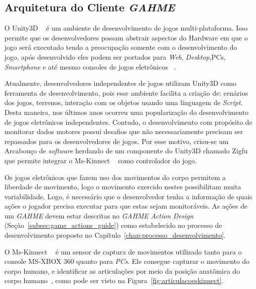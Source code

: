 \subsection{Arquitetura do Cliente \textit{GAHME}}\label{sec:cliente_game}
O Unity3D ~\cite{unity3d} é um ambiente de desenvolvimento de jogos multi-plataforma. Isso permite que os desenvolvedores possam abstrair aspectos do Hardware em que o jogo será executado tendo a preocupação somente com o desenvolvimento do jogo, após desenvolvido eles podem ser portados para \textit{Web}, \textit{Desktop},PCs, \textit{Smartphone} e até mesmo consoles de jogos eletrônicos ~\cite{unitysue}.

Atualmente, desenvolvedores independentes de jogos utilizam Unity3D como ferramenta de desenvolvimento, pois esse ambiente facilita a criação de: cenários dos jogos, terrenos, interação com os objetos usando uma linguagem de \textit{Script}. Desta maneira, nos últimos anos ocorreu uma popularização do desenvolvimento de jogos eletrônicos independentes.  Contudo, o desenvolvimento com propósito de monitorar dados motores possui desafios que não necessariamente precisam ser repassados para os desenvolvedores de jogos. Por esse motivo, criou-se um Arcabouço de \textit{software} herdando de um componente do Unity3D chamado Zigfu~\cite{zigfu} que permite integrar o Ms-Kinnect ~\cite{kinnect2013} como controlador do jogo. 

Os jogos eletrônicos que fazem uso dos movimentos do corpo permitem a liberdade de movimento, logo o movimento exercido nestes possibilitam muita variabilidade. Logo, é necessário que o desenvolvedor tenha a informação de quais ações o jogador precisa executar para que estas sejam monitoráveis. As ações de um \textit{GAHME} devem estar descritas no \textit{GAHME Action Design} (Seção~\ref{subsec:game_actions_guide}) como estabelecido no processo de desenvolvimento proposto no Capítulo~\ref{chap:processo_desenvolvimento}.

O Ms-Kinnect ~\cite{kinnect2013} é um sensor de captura de movimentos utilizado tanto para o console MS-XBOX 360 quanto para \textit{PCs}. Ele consegue capturar o movimento do corpo humano, e identificar as articulações por meio da posição anatômica do corpo humano~\cite{hamill1999bases}, como pode ser visto na Figura~\ref{fig:articulacoeskinnect}.

